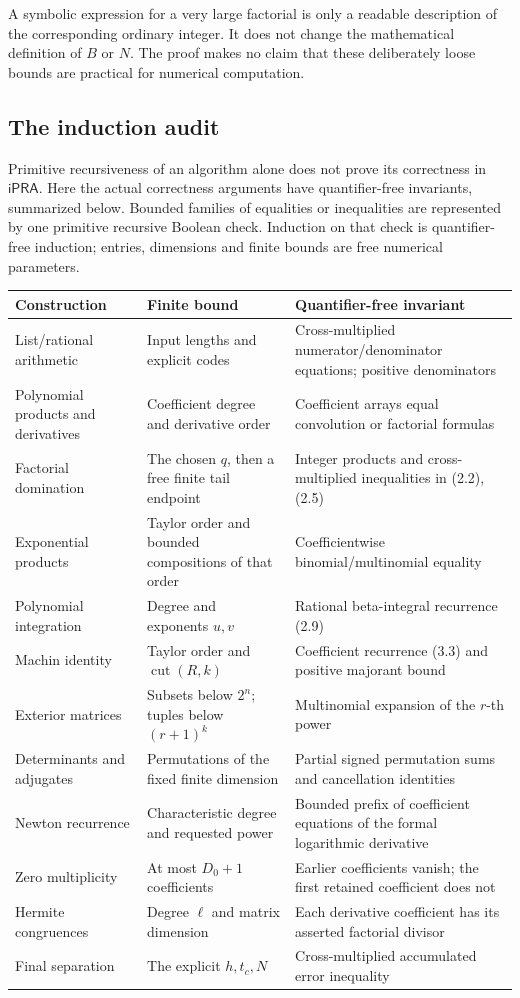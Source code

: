 \documentclass[11pt]{article}
\theoremstyle{definition}
\newcommand{\ipra}{\mathsf{iPRA}}
\newcommand{\cut}{\operatorname{cut}}
\begin{document}
A symbolic expression for a very large factorial is only a readable
description of the corresponding ordinary integer. It does not change
the mathematical definition of \(B\) or \(N\).
The proof makes no claim that these deliberately loose bounds are
practical for numerical computation.

\subsection{The induction audit}

Primitive recursiveness of an algorithm alone does not prove its
correctness in \(\ipra\). Here the actual correctness arguments have
quantifier-free invariants, summarized below. Bounded families of
equalities or inequalities are represented by one primitive recursive
Boolean check. Induction on that check is quantifier-free induction;
entries, dimensions and finite bounds are free numerical parameters.

\small
\begin{longtable}{@{}p{}p{}p{}@{}}
\toprule
Construction & Finite bound & Quantifier-free invariant\\\midrule
\endhead
List/rational arithmetic &
Input lengths and explicit codes &
Cross-multiplied numerator/denominator equations; positive denominators\\
Polynomial products and derivatives &
Coefficient degree and derivative order &
Coefficient arrays equal convolution or factorial formulas\\
Factorial domination &
The chosen \(q\), then a free finite tail endpoint &
Integer products and cross-multiplied inequalities in (2.2), (2.5)\\
Exponential products &
Taylor order and bounded compositions of that order &
Coefficientwise binomial/multinomial equality\\
Polynomial integration &
Degree and exponents \(u,v\) &
Rational beta-integral recurrence (2.9)\\
Machin identity &
Taylor order and \(\cut(R,k)\) &
Coefficient recurrence (3.3) and positive majorant bound\\
Exterior matrices &
Subsets below \(2^n\); tuples below \((r+1)^k\) &
Multinomial expansion of the \(r\)-th power\\
Determinants and adjugates &
Permutations of the fixed finite dimension &
Partial signed permutation sums and cancellation identities\\
Newton recurrence &
Characteristic degree and requested power &
Bounded prefix of coefficient equations of the formal logarithmic derivative\\
Zero multiplicity &
At most \(D_0+1\) coefficients &
Earlier coefficients vanish; the first retained coefficient does not\\
Hermite congruences &
Degree \(\ell\) and matrix dimension &
Each derivative coefficient has its asserted factorial divisor\\
Final separation &
The explicit \(h,t_c,N\) &
Cross-multiplied accumulated error inequality\\
\bottomrule
\end{longtable}
\normalsize
\end{document}
